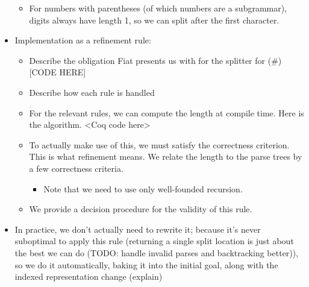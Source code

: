 \begin{itemize}
\begin{itemize}
    \item  For numbers with parentheses (of which numbers are a subgrammar), digits always have length 1, so we can split after the first character. \end{itemize}
  \item  Implementation as a refinement rule:
    \begin{itemize} \item  Describe the obligation Fiat presents us with for the splitter for (\#) {}[CODE HERE] 
    \item  Describe how each rule is handled 
    \item  For the relevant rules, we can compute the length at compile time.  Here is the algorithm. <Coq code here> 
    \item  To actually make use of this, we must satisfy the correctness criterion.  This is what refinement means.  We relate the length to the parse trees by a few correctness criteria. 
      \begin{itemize} \item  Note that we need to use only well-founded recursion. \end{itemize} 
    \item  We provide a decision procedure for the validity of this rule. \end{itemize}
  \item  In practice, we don't actually need to rewrite it; because it's never suboptimal to apply this rule (returning a single split location is just about the best we can do (TODO: handle invalid parses and backtracking better)), so we do it automatically, baking it into the initial goal, along with the indexed representation change (explain) \end{itemize}
%  
%
%
%
%  
